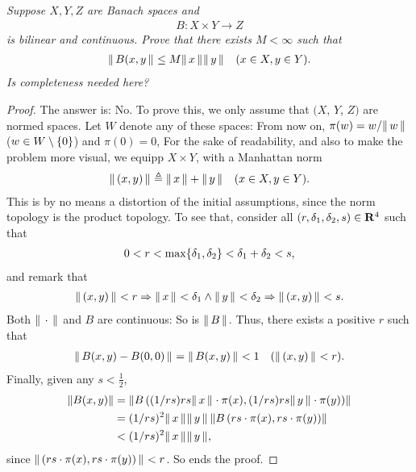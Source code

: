 \textit{
Suppose $X,Y,Z$ are Banach spaces and 
%
  \begin{align*}
    B:X\times Y \to Z
  \end{align*}
is bilinear and continuous. Prove that there exists $M<\infty$ such that 
%
  \begin{align*}
    \| \,B(x, y \, \|_{} \leq M \| \,x \, \|_{}\| \,y \, \|_{} \quad (x\in X, y\in Y).
  \end{align*}
%
Is completeness needed here?}
\begin{proof} The answer is: No. To prove this, we only assume that %
%
  $(X$, $Y$, $Z)$ %
%
are normed spaces. %
Let $W$ denote any of these spaces: From now on, %
%
  $\pi(w) = w/\| \,w \, \|_{}$ ($ w\in W \setminus \{0\}$) and %
  $\pi(0) = 0$,  %
%
For the sake of readability, %
and also to make the problem more visual, we equipp %
%
  $X\times Y$, %
%
with a Manhattan norm %
%
  \begin{align}
    \| \,(x, y) \, \|_{} \triangleq \| \,x \, \|_{} + \| \,y \, \|_{} \quad (x\in X, y \in Y).
  \end{align}
%
This is by no means a distortion of the initial assumptions, %
since the norm topology is the product topology. %
To see that, consider all %
%
  $(r, \delta_1, \delta_2, s)\in {\mathbf R}^4$ %
%
such that %
%
  \begin{align}
    0 < r < \max\{\delta_1, \delta_2\} < \delta_1 + \delta_2 < s, 
  \end{align}
%
and remark that %
%
  \begin{align}
    \| \,(x, y) \, \|_{} < r 
      \Rightarrow 
    \| \,x \, \|_{} < \delta_1 \land 
    \| \,y \, \|_{} < \delta_2
      \Rightarrow 
    \| \,(x, y) \, \|_{} < s .
  \end{align}
Both $\| \,\cdot \, \|_{}$ and $B$ are continuous: So is %
%
  $\| \,B \, \|_{}$. %
%
Thus, there exists a positive $r$ such that %
%
  \begin{align}
    \| \,B(x,y) - B(0, 0) \, \|_{} = \| \,B(x,y) \, \|_{} < 1 \quad (\| \,(x, y) \, \|_{} < r).
  \end{align}
%
Finally, given any $s < \frac{1}{2}$, 
%
  \begin{align}
    \left \| {}{B(x, y)} \right\| 
     & = 
    \left \| B\left(
        (1/rs) rs \| \,x \, \|_{}\cdot \pi(x), 
        (1/rs) rs \| \,y \, \|_{}\cdot \pi(y)
      \right) \right\| \\
      & =
    (1/r s)^{2}\| \,x \, \|_{}\| \,y \, \|_{} 
    \left \| 
      B\left(
        rs\cdot \pi(x), 
        rs \cdot \pi(y) 
        \right) 
      \right\| \\
      & < 
    (1/rs)^2 \| \,x \, \|_{}\| \,y \, \|_{},
  \end{align}
%
since $\| \,(rs \cdot \pi(x), rs \cdot \pi(y)) \, \|_{} < r$. So ends the proof. %
%
\end{proof}
